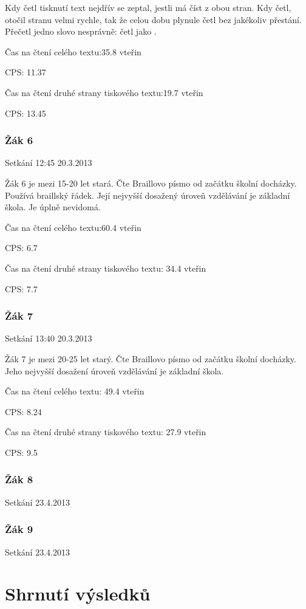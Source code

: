 Kdy četl tisknutí text nejdřív se zeptal, jestli má číst z obou stran.  Kdy četl, otočil stranu velmi rychle, tak že celou dobu plynule četl bez jakékoliv přestání.  Přečetl jedno slovo nesprávně: četl  jako .


Čas na čtení celého textu:35.8 vteřin

CPS: 11.37

Čas na čtení druhé strany tiskového textu:19.7 vteřin

CPS: 13.45

\subsubsection{Žák 6}
Setkání 12:45 20.3.2013

Žák 6 je mezi 15-20 let stará. Čte Braillovo písmo od začátku školní docházky. Používá braillský řádek. Její nejvyšší dosažený úroveň vzdělávání je základní škola.  Je úplně nevidomá.


Čas na čtení celého textu:60.4 vteřin

CPS: 6.7

Čas na čtení druhé strany tiskového textu: 34.4 vteřin

CPS: 7.7

\subsubsection{Žák 7}
Setkání 13:40 20.3.2013

Žák 7 je mezi 20-25 let starý.  Čte Braillovo písmo od začátku školní docházky.  Jeho nejvyšší dosažení úroveň vzdělávání je základní škola.


Čas na čtení celého textu: 49.4 vteřin

CPS: 8.24

Čas na čtení druhé strany tiskového textu: 27.9 vteřin

CPS: 9.5


\subsubsection{Žák 8}
Setkání 23.4.2013

\subsubsection{Žák 9}
Setkání 23.4.2013

\section{Shrnutí výsledků}

